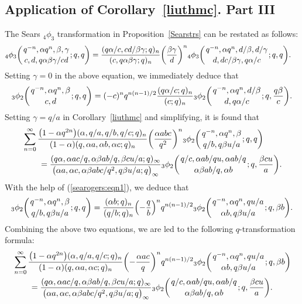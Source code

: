 \documentclass[10pt,a4paper]{amsart}
\numberwithin{equation}{section}
\begin{document}
\subsection{Application of Corollary~\ref{liuthmc}. Part III}
The Sears $_4\phi_3$ transformation in Proposition~\ref{Searstrs} can be restated as follows:
\begin{align*}
	&{_4\phi_3} \biggl({{q^{-n}, \alpha q^n, \beta, \gamma} \atop {c, d, q\alpha \beta \gamma/cd}} ; q, q \biggr)
	=\frac{(q\alpha/c, cd/\beta \gamma; q)_n}{(c, q\alpha \beta \gamma; q)_n} \biggl(\frac{\beta \gamma}{d}\biggr)^n
	{_4\phi_3} \biggl({{q^{-n}, \alpha q^n, d/\beta, d/\gamma} \atop {d, dc/\beta \gamma, q\alpha/c}} ; q, q \biggr).
\end{align*}
Setting $\gamma=0$ in the above equation, we immediately deduce that
\begin{align}\label{searogers:eqn1}
	{_3\phi_2} \biggl({{q^{-n}, \alpha q^n, \beta} \atop {c, d}} ; q, q \biggr)
	=(-c)^n q^{n(n-1)/2} \frac{(q\alpha/c; q)_n}{(c; q)_n}
	{_3\phi_2} \biggl({{q^{-n}, \alpha q^n, d/\beta} \atop {d, q\alpha/c}} ; q, \frac{q\beta}{c} \biggr).
\end{align}
Setting $\gamma=q/{a}$ in Corollary~\ref{liuthmc} and simplifying, it is found that
\begin{align*}%
	&\sum_{n=0}^\infty \frac{\bigl(1-\alpha q^{2n}\bigr)(\alpha, q/a, q/b, q/c; q)_n}{(1-\alpha)(q, \alpha a, \alpha b, \alpha c; q)_n}\biggl(\frac{\alpha abc}{q^2}\biggr)^n
 {_3\phi_2}\biggl({{q^{-n}, \alpha q^n, \beta}
		\atop{q/b, q\beta u/a}}; q, q\biggr)\\
	&\qquad{}=\frac{(q\alpha, \alpha ac/q, \alpha \beta ab/q, \beta cu/a; q )_\infty}{\bigl(\alpha a, \alpha c, \alpha \beta abc/q^2, q\beta u/a; q \bigr)_\infty}{_3\phi_2} \biggl({{q/c, \alpha ab/qu, \alpha ab/q}\atop{\alpha \beta ab/q, \alpha b}}; q, \frac{\beta cu}{a} \biggr).\nonumber
\end{align*}
With the help of (\ref{searogers:eqn1}), we deduce that
\begin{align*}%
{_3\phi_2}\biggl({{q^{-n}, \alpha q^n, \beta}
	\atop{q/b, q\beta u/a}}; q, q\biggr)
=\frac{(\alpha b; q)_n}{(q/b; q)_n} \Bigl(-\frac{q}{b}\Bigr)^n q^{n(n-1)/2} {_3\phi_2}\biggl({{q^{-n}, \alpha q^n, qu/a}
	\atop{\alpha b, q\beta u/a}}; q, \beta b\biggr).
\end{align*}
Combining the above two equations, we are led to the following $q$-transformation formula:
\begin{align*}%
	&\sum_{n=0}^\infty \frac{\bigl(1-\alpha q^{2n}\bigr)(\alpha, q/a, q/c; q)_n}{(1-\alpha)(q, \alpha a, \alpha c; q)_n}\biggl(-\frac{\alpha ac}{q}\biggr)^n q^{n(n-1)/2} {_3\phi_2}\biggl({{q^{-n}, \alpha q^n, qu/a}\atop{\alpha b, q\beta u/a}}; q, \beta b\biggr)\\
	&\qquad=\frac{(q\alpha, \alpha ac/q, \alpha \beta ab/q, \beta cu/a; q )_\infty}{\bigl(\alpha a, \alpha c, \alpha \beta abc/q^2, q\beta u/a; q \bigr)_\infty}{_3\phi_2} \biggl({{q/c, \alpha ab/qu, \alpha ab/q}\atop{\alpha \beta ab/q, \alpha b}}; q, \frac{\beta cu}{a} \biggr).\nonumber
\end{align*}
\end{document}
